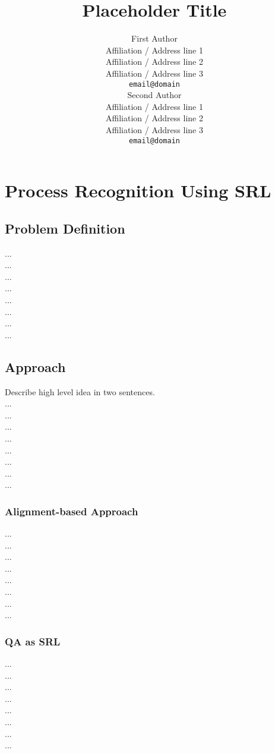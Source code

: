 \documentclass[11pt,a4paper]{article}
\title{Placeholder Title}
\author{First Author \\
  Affiliation / Address line 1 \\
  Affiliation / Address line 2 \\
  Affiliation / Address line 3 \\
  {\tt email@domain} \\\And
  Second Author \\
  Affiliation / Address line 1 \\
  Affiliation / Address line 2 \\
  Affiliation / Address line 3 \\
  {\tt email@domain} \\}
\date{}
\begin{document}
\maketitle




\section{Process Recognition Using SRL}
	\subsection{Problem Definition}
	...\\
	...\\
	...\\
	...\\
	...\\
	...\\	
	...\\
	...\\
	\subsection{Approach}
	Describe high level idea in two sentences.\\
	...\\
	...\\
	...\\
	...\\
	...\\
	...\\	
	...\\
	...\\
	\subsubsection{Alignment-based Approach}
	...\\
	...\\
	...\\
	...\\
	...\\
	...\\	
	...\\
	...\\	
	\subsubsection{QA as SRL}
		...\\
	...\\
	...\\
	...\\
	...\\
	...\\	
	...\\
	...\\
\newpage
\end{document}
